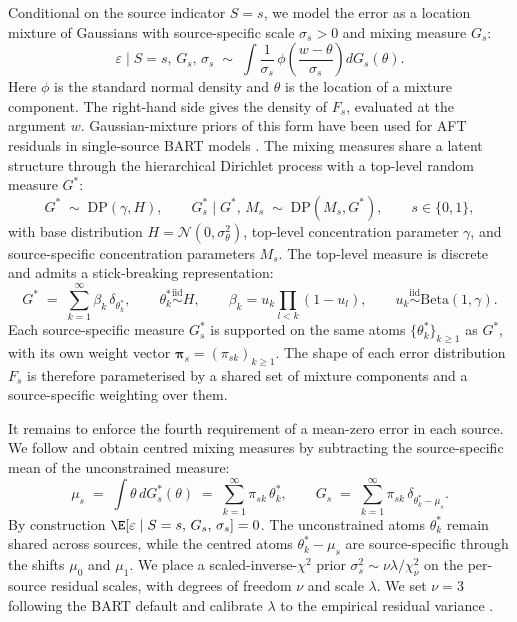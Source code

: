 Conditional on the source indicator $S = s$, we model the error as a location mixture of Gaussians with source-specific scale $\sigma_s > 0$ and mixing measure $G_s$:
\begin{equation}
\varepsilon \mid S = s,\, G_s,\, \sigma_s \;\sim\; \int \frac{1}{\sigma_s}\, \phi\!\left(\frac{w - \theta}{\sigma_s}\right) dG_s(\theta).
\label{eq:hdp-fs}
\end{equation}
Here $\phi$ is the standard normal density and $\theta$ is the location of a mixture component.
The right-hand side gives the density of $F_s$, evaluated at the argument $w$.
Gaussian-mixture priors of this form have been used for AFT residuals in single-source BART models \citep{henderson2020individualized}.
The mixing measures share a latent structure through the hierarchical Dirichlet process \citep{teh2006hierarchical} with a top-level random measure $G^*$:
\begin{equation}
G^* \;\sim\; \mathrm{DP}(\gamma, H), \qquad G_s^* \mid G^*,\, M_s \;\sim\; \mathrm{DP}(M_s, G^*), \qquad s \in \{0, 1\},
\label{eq:hdp-prior}
\end{equation}
with base distribution $H = \mathcal{N}(0, \sigma_\theta^2)$, top-level concentration parameter $\gamma$, and source-specific concentration parameters $M_s$.
The top-level measure is discrete and admits a stick-breaking representation:
\begin{equation}
G^* \;=\; \sum_{k=1}^\infty \beta_k\, \delta_{\theta_k^*}, \qquad \theta_k^* \stackrel{\mathrm{iid}}{\sim} H, \qquad \beta_k = u_k \prod_{l < k}(1 - u_l), \qquad u_k \stackrel{\mathrm{iid}}{\sim} \mathrm{Beta}(1, \gamma).
\label{eq:hdp-stick}
\end{equation}
Each source-specific measure $G_s^*$ is supported on the same atoms $\{\theta_k^*\}_{k\geq 1}$ as $G^*$, with its own weight vector $\bm{\pi}_s = (\pi_{sk})_{k \ge 1}$.
The shape of each error distribution $F_s$ is therefore parameterised by a shared set of mixture components and a source-specific weighting over them.

It remains to enforce the fourth requirement of a mean-zero error in each source.
We follow \citet{yang2010semiparametric} and obtain centred mixing measures by subtracting the source-specific mean of the unconstrained measure:
\begin{equation}
\mu_s \;=\; \int \theta\, dG_s^*(\theta) \;=\; \sum_{k=1}^\infty \pi_{sk}\, \theta_k^*, \qquad G_s \;=\; \sum_{k=1}^\infty \pi_{sk}\, \delta_{\theta_k^* - \mu_s}.
\label{eq:hdp-centring}
\end{equation}
By construction $\E[\varepsilon \mid S = s,\, G_s,\, \sigma_s] = 0$.
The unconstrained atoms $\theta_k^*$ remain shared across sources, while the centred atoms $\theta_k^* - \mu_s$ are source-specific through the shifts $\mu_0$ and $\mu_1$.
We place a scaled-inverse-$\chi^2$ prior $\sigma_s^2 \sim \nu\lambda / \chi^2_\nu$ on the per-source residual scales, with degrees of freedom $\nu$ and scale $\lambda$.
We set $\nu = 3$ following the BART default and calibrate $\lambda$ to the empirical residual variance \citep{chipman2010bart}.


